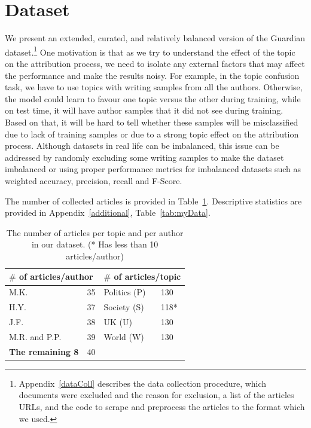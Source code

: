 \documentclass[11pt]{article}
\begin{document}
\section{Dataset\label{subsec:dataset}}
We present an extended, curated, and relatively balanced version of the Guardian dataset.\footnote{Appendix~\ref{dataColl} describes the data collection procedure, which documents were excluded and the reason for exclusion, a list of the articles URLs, and the code to scrape and preprocess the articles to the format which we used.} One motivation is that as we try to understand the effect of the topic on the attribution process, we need to isolate any external factors that may affect the performance and make the results noisy. For example, in the topic confusion task, we have to use topics with writing samples from all the authors. Otherwise, the model could learn to favour one topic versus the other during training, while on test time, it will have author samples that it did not see during training. Based on that, it will be hard to tell whether these samples will be misclassified due to lack of training samples or due to a strong topic effect on the attribution process. Although datasets in real life can be imbalanced, this issue can be addressed by randomly excluding some writing samples to make the dataset imbalanced or using proper performance metrics for imbalanced datasets such as weighted accuracy, precision, recall and F-Score. 

The number of collected articles is provided in Table~\ref{tab:myData_short}. Descriptive statistics are provided in Appendix~\ref{additional}, Table~\ref{tab:myData}.
\begin{table}[ht]
\caption{The number of articles per topic and per author in our dataset. (* Has less than 10 articles/author)}
    \label{tab:myData_short}
    \centering
    \begin{tabular}{ll |ll }
    \hline 
    \multicolumn{2}{l}{\textbf{$\#$ of articles/author}}   & \multicolumn{2}{|l}{\textbf{$\#$ of articles/topic}}  \\
    \hline
     M.K.                & 35   &  Politics (P) & 130 \\ 
     H.Y.                & 37   &  Society (S)  & 118*  \\
     J.F.                & 38   &  UK (U)       & 130    \\
     M.R. and P.P.       & 39   &  World (W)    & 130    \\
     \textbf{The remaining 8}   & 40 & & \\
     \hline
     \end{tabular}
\end{table}
\end{document}
